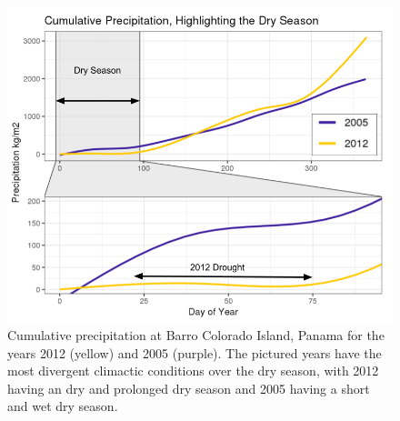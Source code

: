 
\begin{figure}[!h]
    \centering
    \includegraphics[width=.65\textwidth]{Hydro_Paper_LaTeX/Hydro_Paper_Figures/precip.png}
    \caption[Precipitation]{Cumulative precipitation at Barro Colorado Island, Panama for the years 2012 (yellow) and 2005 (purple). The pictured years have the most divergent climactic conditions over the dry season, with 2012 having an dry and prolonged dry season and 2005 having a short and wet dry season. 
    }
    \label{fig:precip}
\end{figure}
